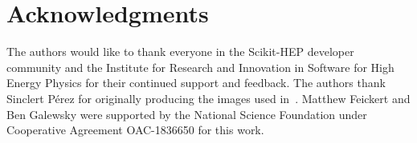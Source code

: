 \section{Acknowledgments}\label{sec:acknowledgements}

The authors would like to thank everyone in the Scikit-HEP developer community and the Institute for Research and Innovation in Software for High Energy Physics for their continued support and feedback.
The authors thank Sinclert P{\'e}rez for originally producing the images used in~.
Matthew Feickert and Ben Galewsky were supported by the National Science Foundation under Cooperative Agreement OAC-1836650 for this work.
